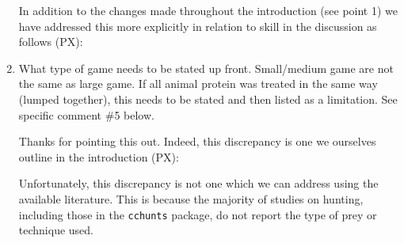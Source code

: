 \documentclass{article}
\newcommand{\rev}[1]{{\color{ForestGreen}#1}}
\begin{document}
\begin{enumerate}
\rev{In addition to the changes made throughout the introduction (see point 1) we have addressed this more explicitly in relation to skill in the discussion as follows (PX): 
}

    \item What type of game needs to be stated up front. Small/medium game are not the same as large game. If all animal protein was treated in the same way (lumped together), this needs to be stated and then listed as a limitation. See specific comment \#5 below.

\rev{Thanks for pointing this out. Indeed, this discrepancy is one we ourselves outline in the introduction (PX): 


Unfortunately, this discrepancy is not one which we can address using the available literature. This is because the majority of studies on hunting, including those in the \texttt{cchunts} package, do not report the type of prey or technique used. 

}
\end{enumerate}
\end{document}
